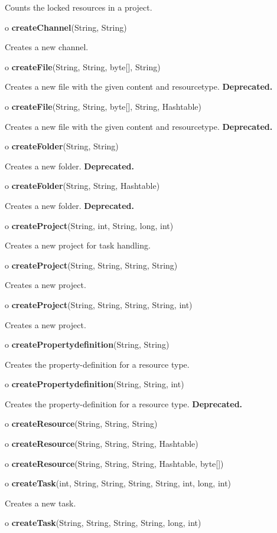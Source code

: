 \begin{description}
Counts the locked resources in a project.  
\item o {\bf createChannel}(String, String)  

Creates a new channel.  
\item o {\bf createFile}(String, String, byte[], String)  

Creates a new file with the given content and resourcetype.\htmlBR
{\bf Deprecated.}  
\item o {\bf createFile}(String, String, byte[], String, Hashtable)  

Creates a new file with the given content and resourcetype. {\bf Deprecated.} 

\item o {\bf createFolder}(String, String)  

Creates a new folder. {\bf Deprecated.}  
\item o {\bf createFolder}(String, String, Hashtable)  

Creates a new folder. {\bf Deprecated.}  
\item o {\bf createProject}(String, int, String, long, int)  

Creates a new project for task handling.  
\item o {\bf createProject}(String, String, String, String)  

Creates a new project.  
\item o {\bf createProject}(String, String, String, String, int)  

Creates a new project.  
\item o {\bf createPropertydefinition}(String, String)  

Creates the property-definition for a resource type.  
\item o {\bf createPropertydefinition}(String, String, int)  

Creates the property-definition for a resource type. {\bf Deprecated.}  
\item o {\bf createResource}(String, String, String)  

\item o {\bf createResource}(String, String, String, Hashtable)  

\item o {\bf createResource}(String, String, String, Hashtable, byte[])  

\item o {\bf createTask}(int, String, String, String, String, int, long, int) 


Creates a new task.  
\item o {\bf createTask}(String, String, String, String, long, int)  


\end{description}
